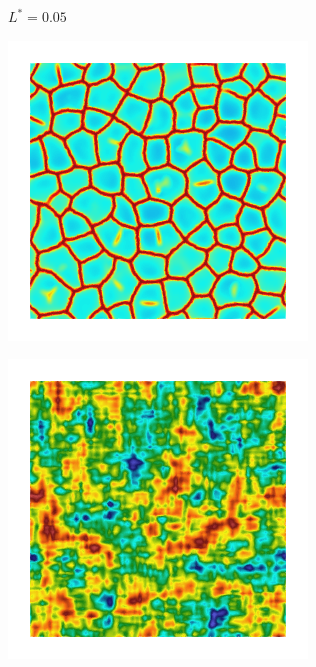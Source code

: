 \begin{figure}[!htbp]
\begin{subfigure}[b]{0.15\textwidth}
    \caption{$L^* = 0.05$}
    \label{fig: Chapter4/2D/psic_sqexp_cartesian_5_5_rho_0_seed_a}
  \end{subfigure}
  \begin{subfigure}[b]{0.15\textwidth}
    \includegraphics[width=\textwidth]{Chapter4/figures/2D/d_sqexp_cartesian_5_5_rho_0_seed_a.png}
    \caption{}
    \label{fig: Chapter4/2D/d_sqexp_cartesian_5_5_rho_0_seed_a}
  \end{subfigure}
  \begin{subfigure}[b]{0.15\textwidth}
    \includegraphics[width=\textwidth]{Chapter4/figures/2D/Gc_exp_cartesian_5_5_rho_0_seed_b.png}

\end{subfigure}
\end{figure}
